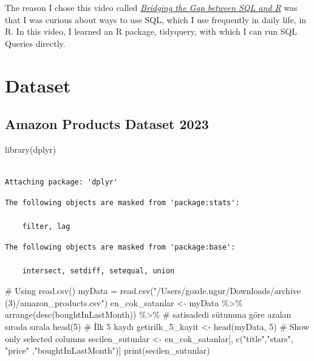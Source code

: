 \documentclass[
  letterpaper,
  DIV=11,
  numbers=noendperiod]{scrreprt}
\newenvironment{Shaded}{\begin{snugshade}}{\end{snugshade}}
\newcommand{\CommentTok}[1]{\textcolor[rgb]{0.37,0.37,0.37}{#1}}
\newcommand{\DecValTok}[1]{\textcolor[rgb]{0.68,0.00,0.00}{#1}}
\newcommand{\FunctionTok}[1]{\textcolor[rgb]{0.28,0.35,0.67}{#1}}
\newcommand{\NormalTok}[1]{\textcolor[rgb]{0.00,0.23,0.31}{#1}}
\newcommand{\OtherTok}[1]{\textcolor[rgb]{0.00,0.23,0.31}{#1}}
\newcommand{\SpecialCharTok}[1]{\textcolor[rgb]{0.37,0.37,0.37}{#1}}
\newcommand{\StringTok}[1]{\textcolor[rgb]{0.13,0.47,0.30}{#1}}
\begin{document}
The reason I chose this video called
\href{https://www.youtube.com/watch?v=JwP5KdWSgqE\&list=PL9HYL-VRX0oTOK4cpbCbRk15K2roEgzVW\&t=1094s}{\emph{Bridging
the Gap between SQL and R}} was that I was curious about ways to use
SQL, which I use frequently in daily life, in R. In this video, I
learned an R package, tidyquery, with which I can run SQL Queries
directly.

\hypertarget{dataset}{%
\section{Dataset}\label{dataset}}

\hypertarget{amazon-products-dataset-2023}{%
\subsection{Amazon Products Dataset
2023}\label{amazon-products-dataset-2023}}

\begin{Shaded}
\begin{Highlighting}[]
\FunctionTok{library}\NormalTok{(dplyr)}
\end{Highlighting}
\end{Shaded}

\begin{verbatim}

Attaching package: 'dplyr'
\end{verbatim}

\begin{verbatim}
The following objects are masked from 'package:stats':

    filter, lag
\end{verbatim}

\begin{verbatim}
The following objects are masked from 'package:base':

    intersect, setdiff, setequal, union
\end{verbatim}

\begin{Shaded}
\begin{Highlighting}[]
\CommentTok{\# Using read.csv()}
\NormalTok{myData }\OtherTok{=} \FunctionTok{read.csv}\NormalTok{(}\StringTok{"/Users/gozde.ugur/Downloads/archive (3)/amazon\_products.csv"}\NormalTok{) }
\NormalTok{en\_cok\_satanlar }\OtherTok{\textless{}{-}}\NormalTok{ myData }\SpecialCharTok{\%\textgreater{}\%} 
  \FunctionTok{arrange}\NormalTok{(}\FunctionTok{desc}\NormalTok{(boughtInLastMonth)) }\SpecialCharTok{\%\textgreater{}\%}  \CommentTok{\# satisadedi sütununa göre azalan sırada sırala}
  \FunctionTok{head}\NormalTok{(}\DecValTok{5}\NormalTok{)  }\CommentTok{\# İlk 5 kaydı getirilk\_5\_kayit \textless{}{-} head(myData, 5)}
\CommentTok{\# Show only selected columns}
\NormalTok{secilen\_sutunlar }\OtherTok{\textless{}{-}}\NormalTok{ en\_cok\_satanlar[, }\FunctionTok{c}\NormalTok{(}\StringTok{"title"}\NormalTok{,}\StringTok{"stars"}\NormalTok{, }\StringTok{"price"}\NormalTok{ ,}\StringTok{"boughtInLastMonth"}\NormalTok{)]}
\FunctionTok{print}\NormalTok{(secilen\_sutunlar)}
\end{Highlighting}
\end{Shaded}
\end{document}

